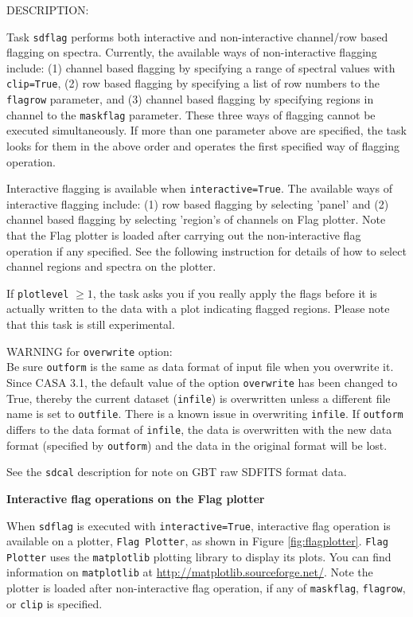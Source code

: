 DESCRIPTION:

Task {\tt sdflag} performs both interactive and non-interactive channel/row 
based flagging on spectra.
Currently, the available ways of non-interactive flagging include: 
(1) channel based flagging by specifying a range of spectral values 
with {\tt clip=True}, (2) row based flagging by specifying a list of row 
numbers to the {\tt flagrow} parameter, and (3) channel based flagging by 
specifying regions in channel to the {\tt maskflag} parameter. 
These three ways of flagging cannot be executed simultaneously. 
If more than one parameter above are specified, the task looks for 
them in the above order and operates the first specified way of 
flagging operation.

Interactive flagging is available when {\tt interactive=True}. 
The available ways of interactive flagging include: 
(1) row based flagging by selecting 'panel' and (2) channel
based flagging by selecting 'region's of channels on Flag plotter. 
Note that the Flag plotter is loaded after carrying out the 
non-interactive flag operation if any specified. 
See the following instruction for
details of how to select channel regions and spectra on the plotter.

If {\tt plotlevel} $ \ge 1 $, the task asks you if you really apply the 
flags before it is actually written to the data with a plot 
indicating flagged regions.
Please note that this task is still experimental.

WARNING for {\tt overwrite} option:\\
Be sure {\tt outform} is the same as data format of input file when you
overwrite it. Since CASA 3.1, the default value of the option {\tt overwrite}
has been changed to True, thereby the current dataset ({\tt infile}) is 
overwritten unless a different file name is set to {\tt outfile}. 
There is a known issue in overwriting {\tt infile}. If {\tt outform} differs to the
data format of {\tt infile}, the data is overwritten with the new data format 
(specified by {\tt outform}) and the data in the original format will be lost.

See the {\tt sdcal} description for note on GBT raw SDFITS format data.



\bigskip
{\bf Interactive flag operations on the Flag plotter}

When {\tt sdflag} is executed with {\tt interactive=True}, 
interactive flag operation is available on a plotter, {\tt Flag Plotter}, 
as shown in Figure \ref{fig:flagplotter}.
{\tt Flag Plotter} uses the {\tt matplotlib} plotting library to display 
its plots. You can find information on {\tt matplotlib} at
\url{http://matplotlib.sourceforge.net/}.
Note the plotter is loaded after non-interactive flag operation, 
if any of {\tt maskflag}, {\tt flagrow}, or {\tt clip} is specified.

